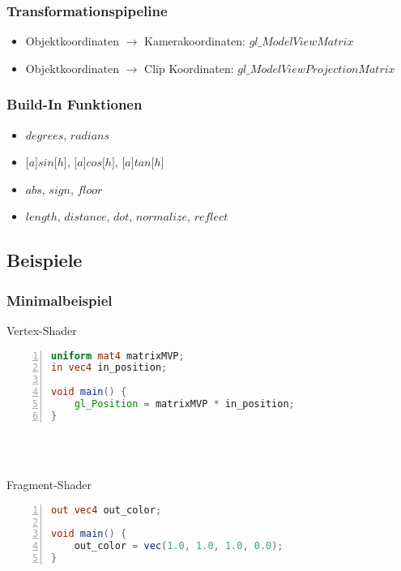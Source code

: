 \subsubsection{Transformationspipeline}
\begin{itemize}
	\item Objektkoordinaten \(\rightarrow\) Kamerakoordinaten: \(gl\_ModelViewMatrix\)
	\item Objektkoordinaten \(\rightarrow\) Clip Koordinaten: \(gl\_ModelViewProjectionMatrix\)
\end{itemize}

\subsubsection{Build-In Funktionen}
\begin{itemize}
	\item \(degrees\), \(radians\)
	\item \(\lbrack a \rbrack sin \lbrack h \rbrack\), \(\lbrack a \rbrack cos \lbrack h \rbrack\), \(\lbrack a \rbrack tan \lbrack h \rbrack\)
	\item \(abs\), \(sign\), \(floor\)
	\item \(length\), \(distance\), \(dot\), \(normalize\), \(reflect\)
\end{itemize}


\subsection{Beispiele}

\subsubsection{Minimalbeispiel}
\begin{minipage}{\textwidth}
Vertex-Shader
\begin{lstlisting}[frame=single,numbers=left,mathescape,language=GLSL]
uniform mat4 matrixMVP;
in vec4 in_position;

void main() {
	gl_Position = matrixMVP * in_position;
}
\end{lstlisting}
\end{minipage}
\\\\
\begin{minipage}{\textwidth}
Fragment-Shader
\begin{lstlisting}[frame=single,numbers=left,mathescape,language=GLSL]
out vec4 out_color;

void main() {
	out_color = vec(1.0, 1.0, 1.0, 0.0);
}
\end{lstlisting}
\end{minipage}

